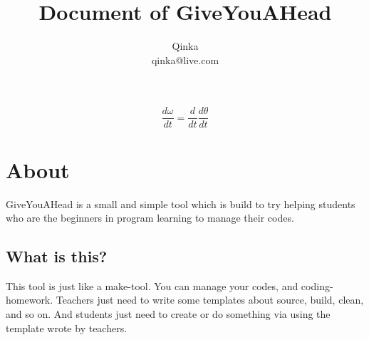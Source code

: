 \documentclass[UTF8]{article} %
\title{Document of GiveYouAHead}
\author{Qinka\\qinka@live.com}
\begin{document}
$$
\frac{d\omega}{dt}=\frac{d}{dt}\frac{d\theta}{dt}
$$

\newpage	
\maketitle
\newpage
\tableofcontents
\newpage
\section{About}
GiveYouAHead is a small and simple tool which is build to try helping students who are the beginners in program learning to manage their codes.
\subsection{What is this?}
This tool is just like a make-tool. You can manage your codes, and coding-homework. Teachers just need to write some templates about source, build, clean, and so on. And students just need to create or do something via using the template wrote by teachers. 
\end{document}
